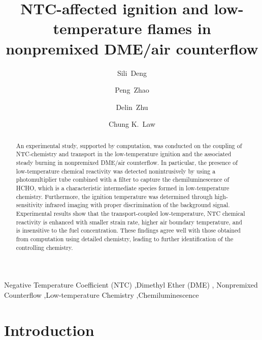 \documentclass[review,3p,times]{elsarticleUS}
\begin{document}
\begin{frontmatter}

\title{NTC-affected ignition and low-temperature flames in nonpremixed DME/air counterflow}

\author[Princeton]{Sili~Deng}
\author[Princeton]{Peng~Zhao}
\author[Princeton]{Delin~Zhu}
\author[Princeton,Tsinghua]{Chung K.~Law}

\address[Princeton]{Department of Mechanical and Aerospace Engineering, Princeton University, Princeton, NJ 08544, USA}
\address[Tsinghua]{Center for Combustion Energy, Tsinghua University, Beijing 100084, China}

\begin{abstract}
An experimental study, supported by computation, was conducted on the coupling of NTC-chemistry and transport in the low-temperature ignition and the associated steady burning in nonpremixed DME/air counterflow.  In particular, the presence of low-temperature chemical reactivity was detected nonintrusively by using a photomultiplier tube combined with a filter to capture the chemiluminescence of HCHO, which is a characteristic intermediate species formed in low-temperature chemistry.  Furthermore, the ignition temperature was determined through high-sensitivity infrared imaging with proper discrimination of the background signal. Experimental results show that the transport-coupled low-temperature, NTC chemical reactivity is enhanced with smaller strain rate, higher air boundary temperature, and is insensitive to the fuel concentration.  These findings agree well with those obtained from computation using detailed chemistry, leading to further identification of the controlling chemistry.
\end{abstract}

\begin{keyword} 
Negative Temperature Coefficient (NTC) \sep Dimethyl Ether (DME) \sep
Nonpremixed Counterflow \sep Low-temperature Chemistry \sep Chemiluminescence
\end{keyword}

\end{frontmatter}

\section{Introduction}
\end{document}
